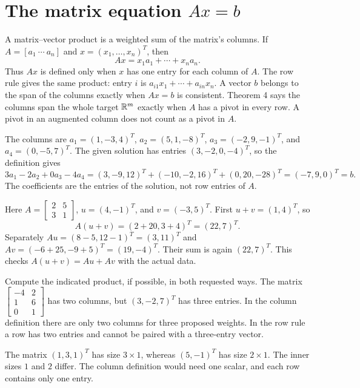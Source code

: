 \section{The matrix equation $Ax=b$}
A matrix--vector product is a weighted sum of the matrix's columns.
If $A=[a_1\ \cdots\ a_n]$ and $x=(x_1,\ldots,x_n)^T$, then
\[Ax=x_1a_1+\cdots+x_na_n.\]
Thus $Ax$ is defined only when $x$ has one entry for each column of $A$.
The row rule gives the same product: entry $i$ is
$a_{i1}x_1+\cdots+a_{in}x_n$.
A vector $b$ belongs to the span of the columns exactly when $Ax=b$ is
consistent. Theorem 4 says the columns span the whole target $\mathbb{R}^m$
exactly when $A$ has a pivot in every row. A pivot in an augmented
column does not count as a pivot in $A$.

The columns are $a_1=(1,-3,4)^T$, $a_2=(5,1,-8)^T$,
$a_3=(-2,9,-1)^T$, and $a_4=(0,-5,7)^T$.
The given solution has entries $(3,-2,0,-4)^T$, so the definition gives
\[3a_1-2a_2+0a_3-4a_4
=(3,-9,12)^T+(-10,-2,16)^T+(0,20,-28)^T
=(-7,9,0)^T=b.\]
The coefficients are the entries of the solution, not row entries of $A$.

Here $A=\begin{bmatrix}2&5\\3&1\end{bmatrix}$,
$u=(4,-1)^T$, and $v=(-3,5)^T$. First $u+v=(1,4)^T$, so
\[A(u+v)=(2+20,3+4)^T=(22,7)^T.\]
Separately $Au=(8-5,12-1)^T=(3,11)^T$ and
$Av=(-6+25,-9+5)^T=(19,-4)^T$. Their sum is again $(22,7)^T$.
This checks $A(u+v)=Au+Av$ with the actual data.

\goal Compute the indicated product, if possible, in both requested ways.
The matrix $\begin{bmatrix}-4&2\\1&6\\0&1\end{bmatrix}$ has two columns,
but $(3,-2,7)^T$ has three entries. In the column definition there are
only two columns for three proposed weights. In the row rule a row has
two entries and cannot be paired with a three-entry vector.

The matrix $(1,3,1)^T$ has size $3\times1$, whereas $(5,-1)^T$ has
size $2\times1$. The inner sizes $1$ and $2$ differ. The column
definition would need one scalar, and each row contains only one entry.

